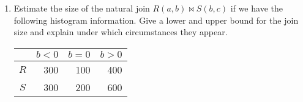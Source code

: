\begin{enumerate}
  \item Estimate the size of the natural join $R(a,b) \Join S(b,c)$ if we have the following histogram information.
        Give a lower and upper bound for the join size and explain under which circumstances they appear.

        \begin{center}
          \begin{tabular}{c|r|r|r}
                & $b<0$ & $b=0$ & $b>0$ \\ \hline
            $R$ & 300   & 100   & 400   \\
            $S$ & 300   & 200   & 600   \\
          \end{tabular}
        \end{center}

\end{enumerate}


